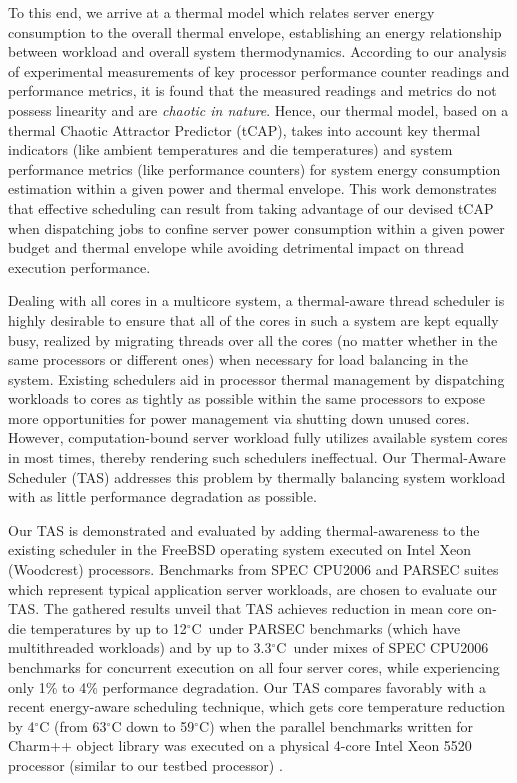 \documentclass[times, 10pt,twocolumn]{IEEEtran}
\begin{document}
To this end, we arrive at a thermal model which relates server energy
consumption to the overall thermal envelope, establishing an energy
relationship between workload and overall system thermodynamics.
According to our analysis of experimental measurements of key processor
performance counter readings and performance metrics, it is found that
the measured readings and metrics do not possess linearity and are
\textit{chaotic in nature}.  Hence, our thermal model, based on a
thermal Chaotic Attractor Predictor (tCAP), takes into account key
thermal indicators (like ambient temperatures and die temperatures) and
system performance metrics (like performance counters) for system energy
consumption estimation within a given power and thermal envelope.  This
work demonstrates that effective scheduling can result from taking
advantage of our devised tCAP when dispatching jobs to confine server
power consumption within a given power budget and thermal envelope while
avoiding detrimental impact on thread execution performance.

Dealing with all cores in a multicore system, a thermal-aware thread
scheduler is highly desirable to ensure that all of the cores in such a
system are kept equally busy, realized by migrating threads over all the
cores (no matter whether in the same processors or different ones) when
necessary for load balancing in the system.  Existing schedulers aid in
processor thermal management by dispatching workloads to cores as
tightly as possible within the same processors to expose more
opportunities for power management via shutting down unused cores.
However, computation-bound server workload fully utilizes available
system cores in most times, thereby rendering such schedulers
ineffectual.  Our Thermal-Aware Scheduler (TAS) addresses this problem
by thermally balancing system workload with as little performance
degradation as possible.  

Our TAS is demonstrated and evaluated by adding thermal-awareness to the
existing scheduler in the FreeBSD operating system executed on Intel
Xeon (Woodcrest) processors.  Benchmarks from SPEC CPU2006 and PARSEC
suites which represent typical application server workloads, are chosen
to evaluate our TAS.  The gathered results unveil that TAS achieves
reduction in mean core on-die temperatures by up to 12$^{\circ}$C\ under
PARSEC benchmarks (which have multithreaded workloads) and by up to
3.3$^{\circ}$C\ under mixes of SPEC CPU2006 benchmarks for concurrent
execution on all four server cores, while experiencing only 1\% to 4\%
performance degradation.  Our TAS compares favorably with a recent
energy-aware scheduling technique, which gets core temperature reduction
by 4$^\circ$C (from 63$^\circ$C down to 59$^\circ$C) when the parallel
benchmarks written for Charm++ object library was executed on a physical
4-core Intel Xeon 5520 processor (similar to our testbed processor)
\cite{Sarood2011}.
\end{document}
